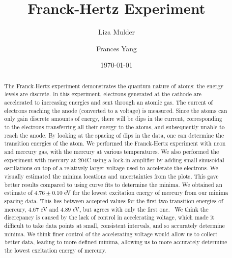 \documentclass[prb,preprint]{revtex4-1}
\begin{document}

\title{Franck-Hertz Experiment}


\author{Liza Mulder}


\author{Frances Yang}


\date{\today}



\begin{abstract}
The Franck-Hertz experiment demonstrates the quantum nature of atoms: the energy levels are discrete. 
In this experiment, electrons generated at the cathode are accelerated to increasing energies and sent through an atomic gas. The current of electrons reaching the anode (converted to a voltage) is measured. 
Since the atoms can only gain discrete amounts of energy, there will be dips in the current, corresponding to the electrons transferring all their energy to the atoms, and subsequently unable to reach the anode.
By looking at the spacing of dips in the data, one can determine the transition energies of the atom. 
We performed the Franck-Hertz experiment with neon and mercury gas, with the mercury at various temperatures. 
We also performed the experiment with mercury at 204\degree C using a lock-in amplifier by adding small sinusoidal oscillations on top of a relatively larger voltage used to accelerate the electrons.
We visually estimated the minima locations and uncertainties from the plots. 
This gave better results compared to using curve fits to determine the minima.
We obtained an estimate of $4.76\pm 0.10$ eV for the lowest excitation energy of mercury from our minima spacing data.
This lies between accepted values for the first two transition energies of mercury,  $4.67$ eV and $4.89$ eV, but agrees with only the first one.~\cite{new}
We think the discrepancy is caused by the lack of control in accelerating voltage, which made it difficult to take data points at small, consistent intervals, and so accurately determine minima.
We think finer control of the accelerating voltage would allow us to collect better data, leading to more defined minima, allowing us to more accurately determine the lowest excitation energy of mercury. 
\end{abstract}
\end{document}
